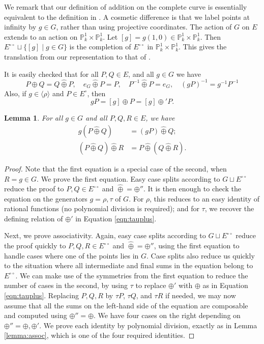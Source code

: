 \documentclass[18pt]{article}
\newtheorem{lemma}[theorem]{Lemma}
\newcommand{\ring}[1]{\mathbb{#1}}
\newcommand{\Eo}{E^\circ}
\newcommand{\Eoo}{E^{\circ\circ}}
\newcommand{\hplus}{\hat\oplus}
\newcommand{\Go}{\langle\rho\rangle}
\begin{document}
We remark that our definition of addition on the complete curve is
essentially equivalent to the definition in
\cite{bernstein2011complete}.  A cosmetic difference is that we label
points at infinity by $g\in G$, rather than using projective
coordinates.  The action of $G$ on $E$ extends to an action on
$\ring{P}^1_k\times \ring{P}^1_k$.  Let $[g] = g (1,0)\in
\ring{P}^1_k\times \ring{P}^1_k$.  Then $\Eoo\sqcup \{[g]\mid g\in
G\}$ is the completion of $\Eoo$ in $\ring{P}^1_k\times \ring{P}^1_k$.
This gives the translation from our representation to that of
\cite{bernstein2011complete}.


It is easily checked that for all $P,Q\in E$,  and all $g\in G$ we have
\begin{equation}\label{eqn:cid}
P\hplus Q = Q\hplus P,\quad 
e_G \hplus P = P,\quad P^{-1} \hplus P = e_G,\quad (g P)^{-1} = g^{-1} P^{-1}
\end{equation}
Also, if $g\in \Go$ and $P\in \Eo$, then
\[
 g P = [g]\oplus P = [g] \oplus' P.
\]

\begin{lemma}\label{lemma:pseudo} For all $g\in G$ and all $P,Q,R\in E$, we have
\begin{align}
g (P\hplus Q) &= (g P)\hplus Q;\\
(P\hplus Q)\hplus R &= P \hplus (Q\hplus R).
\end{align}
\end{lemma}

\begin{proof}  
  Note that the first equation is a special case of the second, when
  $R=g\in G$.  We prove the first equation.  Easy case splits
  according to $G\sqcup \Eoo$ reduce the proof to $P,Q\in \Eoo$ and
  $\hplus =\oplus''$.  It is then enough to check the equation on the
  generators $g=\rho,\tau$ of $G$.  For $\rho$, this reduces to an easy
  identity of rational functions (no polynomial division is required);
  and for $\tau$, we recover the defining relation of $\oplus'$ in
  Equation \ref{eqn:tauplus}.

  Next, we prove associativity.  Again, easy case splits
  according to $G\sqcup \Eoo$ reduce the proof quickly to $P,Q,R\in
  \Eoo$ and $\hplus = \oplus''$, using the first equation to handle
  cases where one of the points lies in $G$.  Case splits also reduce
  us quickly to the situation where all intermediate and final sums in
  the equation belong to $\Eoo$.  We can make use of the symmetries
  from the first equation to reduce the number of cases in the second,
  by using $\tau$ to replace $\oplus'$ with $\oplus$ as in Equation
  \ref{eqn:tauplus}.  Replacing $P,Q,R$ by $\tau P$, $\tau Q$, and $\tau
  R$ if needed, we may now assume that all the sums on the left-hand
  side of the equation are composable and computed using
  $\oplus''=\oplus$.  We have four cases on the right depending on
  $\oplus'' =\oplus,\oplus'$.  We prove each identity by polynomial
  division, exactly as in Lemma \ref{lemma:assoc}, which is one of the
  four required identities.
\end{proof}
\end{document}
